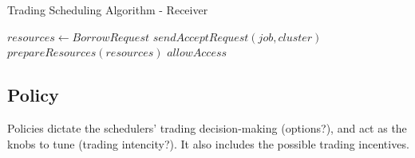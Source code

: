 \begin{algorithm}
    \caption{Trading Scheduling Algorithm - Receiver}
    \begin{algorithmic}
            \State $ resources \gets BorrowRequest $ 
             
            \State $sendAcceptRequest(job, cluster)$
            \State $prepareResources(resources)$
            \State $allowAccess$
            \EndIf
    \end{algorithmic}
    \end{algorithm} 



\subsection{Policy} \label{policy}
Policies dictate the schedulers' trading decision-making (options?), and 
act as the knobs to tune (trading intencity?). It also includes the possible trading incentives.



